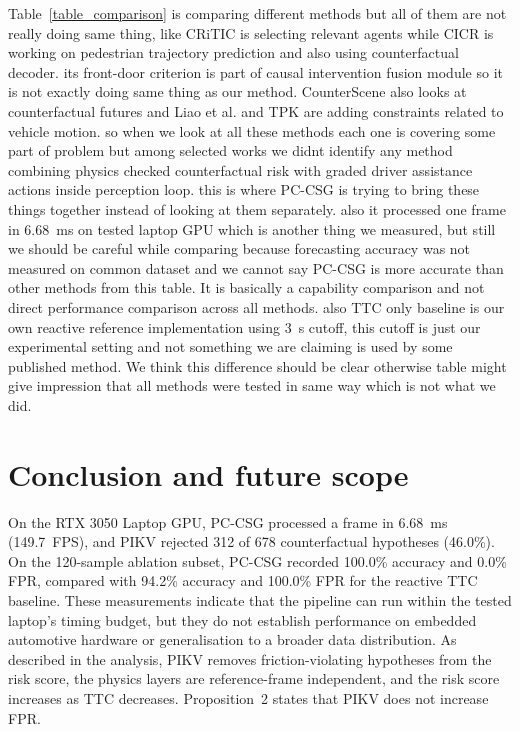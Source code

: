 Table~\ref{table_comparison} is comparing different methods but all of them are not really doing same thing, like CRiTIC \cite{ahmadi2025critic} is selecting relevant agents while CICR \cite{han2025cicr} is working on pedestrian trajectory prediction and also using counterfactual decoder. its front-door criterion is part of causal intervention fusion module so it is not exactly doing same thing as our method. CounterScene \cite{jing2026counterscene} also looks at counterfactual futures and Liao et al. \cite{liao2024physics} and TPK \cite{baden2025tpk} are adding constraints related to vehicle motion. so when we look at all these methods each one is covering some part of problem but among selected works we didnt identify any method combining physics checked counterfactual risk with graded driver assistance actions inside perception loop. this is where PC-CSG is trying to bring these things together instead of looking at them separately. also it processed one frame in 6.68~ms on tested laptop GPU which is another thing we measured, but still we should be careful while comparing because forecasting accuracy was not measured on common dataset and we cannot say PC-CSG is more accurate than other methods from this table. It is basically a capability comparison and not direct performance comparison across all methods. also TTC only baseline is our own reactive reference implementation using 3~s cutoff, this cutoff is just our experimental setting and not something we are claiming is used by some published method. We think this difference should be clear otherwise table might give impression that all methods were tested in same way which is not what we did.

\section{Conclusion and future scope} \label{section5}
On the RTX 3050 Laptop GPU, PC-CSG processed a frame in 6.68~ms (149.7~FPS), and PIKV rejected 312 of 678 counterfactual hypotheses (46.0\%). On the 120-sample ablation subset, PC-CSG recorded 100.0\% accuracy and 0.0\% FPR, compared with 94.2\% accuracy and 100.0\% FPR for the reactive TTC baseline. These measurements indicate that the pipeline can run within the tested laptop's timing budget, but they do not establish performance on embedded automotive hardware or generalisation to a broader data distribution. As described in the analysis, PIKV removes friction-violating hypotheses from the risk score, the physics layers are reference-frame independent, and the risk score increases as TTC decreases. Proposition~2 states that PIKV does not increase FPR.


